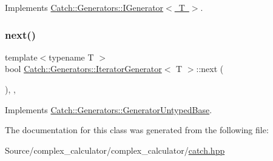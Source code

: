 Implements \mbox{\hyperlink{struct_catch_1_1_generators_1_1_i_generator_a525d381fc9249a885b075a0632a8579a}{Catch\+::\+Generators\+::\+I\+Generator$<$ T $>$}}.

\mbox{\label{class_catch_1_1_generators_1_1_iterator_generator_acafb4fa1eebe5e1db571621a35a3f137}} 
\subsubsection{\texorpdfstring{next()}{next()}}
{\footnotesize\ttfamily template$<$typename T $>$ \\
bool \mbox{\hyperlink{class_catch_1_1_generators_1_1_iterator_generator}{Catch\+::\+Generators\+::\+Iterator\+Generator}}$<$ T $>$\+::next (\begin{DoxyParamCaption}{ }\end{DoxyParamCaption})\hspace{0.3cm}{\ttfamily [inline]}, {\ttfamily [override]}, {\ttfamily [virtual]}}



Implements \mbox{\hyperlink{class_catch_1_1_generators_1_1_generator_untyped_base_aeed3c0cd6233c5f553549e453b8d6638}{Catch\+::\+Generators\+::\+Generator\+Untyped\+Base}}.



The documentation for this class was generated from the following file\+:\begin{DoxyCompactItemize}
\item 
Source/complex\+\_\+calculator/complex\+\_\+calculator/\mbox{\hyperlink{catch_8hpp}{catch.\+hpp}}\end{DoxyCompactItemize}
